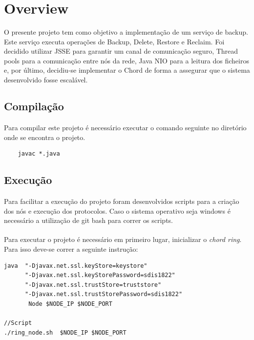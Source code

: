 \documentclass[11pt,oneside]{book}
\begin{document}
\pagebreak

\section{Overview}
\paragraph{}
O presente projeto tem como objetivo a implementação de um serviço de backup. Este serviço 
executa operações de Backup, Delete, Restore e Reclaim. Foi decidido utilizar JSSE para garantir 
um canal de comunicação seguro, Thread pools para a comunicação entre nós da rede, Java NIO para a 
leitura dos ficheiros e, por último, decidiu-se implementar o Chord de forma a assegurar que 
o sistema desenvolvido fosse escalável.

\subsection{Compilação}
\paragraph{}
Para compilar este projeto é necessário executar o comando seguinte no diretório onde se
encontra o projeto.
\begin{lstlisting}
    javac *.java
\end{lstlisting}

\subsection{Execução}
\paragraph{}
Para facilitar a execução do projeto foram desenvolvidos scripts para a criação dos nós e 
execução dos protocolos. Caso o sistema operativo seja windows é necessário a utilização de 
git bash para correr os scripts. 

\paragraph{}
Para executar o projeto é necessário em primeiro lugar, inicializar o   \textit{chord ring}. 
Para isso deve-se correr a seguinte instrução:

\begin{lstlisting}
java  "-Djavax.net.ssl.keyStore=keystore" 
      "-Djavax.net.ssl.keyStorePassword=sdis1822" 
      "-Djavax.net.ssl.trustStore=truststore" 
      "-Djavax.net.ssl.trustStorePassword=sdis1822" 
       Node $NODE_IP $NODE_PORT

//Script
./ring_node.sh  $NODE_IP $NODE_PORT

\end{lstlisting}
\end{document}
